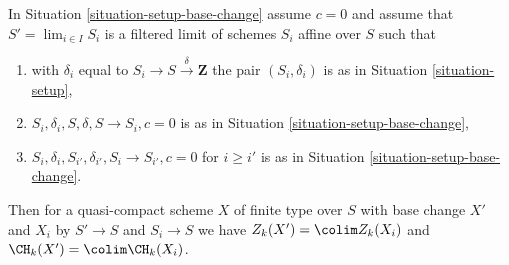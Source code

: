 \begin{lemma}
\label{lemma-chow-limit}
In Situation \ref{situation-setup-base-change} assume $c = 0$
and assume that $S' = \lim_{i \in I} S_i$ is a filtered limit
of schemes $S_i$ affine over $S$ such that
\begin{enumerate}
\item with $\delta_i$ equal to $S_i \to S \xrightarrow{\delta} \mathbf{Z}$
the pair $(S_i, \delta_i)$ is as in Situation \ref{situation-setup},
\item $S_i, \delta_i, S, \delta, S \to S_i, c = 0$ is as in
Situation \ref{situation-setup-base-change},
\item $S_i, \delta_i, S_{i'}, \delta_{i'}, S_i \to S_{i'}, c = 0$ 
for $i \geq i'$ is as in Situation \ref{situation-setup-base-change}.
\end{enumerate}
Then for a quasi-compact scheme $X$ of finite type over $S$
with base change $X'$ and $X_i$ by $S' \to S$ and $S_i \to S$ we have
$Z_k(X') = \colim Z_k(X_i)$ and $\CH_k(X') = \colim \CH_k(X_i)$.
\end{lemma}

